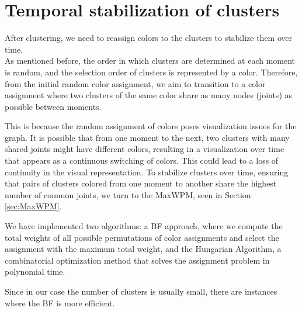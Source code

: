 \chapter{Temporal stabilization of clusters}

After clustering, we need to reassign colors to the clusters to stabilize them over time. \\
As mentioned before, the order in which clusters are determined at each moment is random, and the selection order of clusters is represented by a color.
Therefore, from the initial random color assignment, we aim to transition to a color assignment where two clusters of the same color share as many nodes (joints) as possible between moments.

This is because the random assignment of colors poses visualization issues for the graph.
It is possible that from one moment to the next, two clusters with many shared joints might have different colors, resulting in a visualization over time that appears as a continuous switching of colors. This could lead to a loss of continuity in the visual representation.
To stabilize clusters over time, ensuring that pairs of clusters colored from one moment to another share the highest number of common joints, we turn to the MaxWPM, seen in Section \ref{sec:MaxWPM}.

We have implemented two algorithms: a BF approach, where we compute the total weights of all possible permutations of color assignments and select the assignment with the maximum total weight, and the Hungarian Algorithm, a combinatorial optimization method that solves the assignment problem in polynomial time.

Since in our case the number of clusters is usually small, there are instances where the BF is more efficient.

